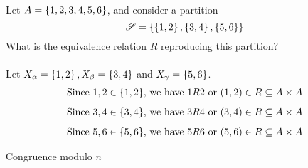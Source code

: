 \begin{example}
Let $A = \left\{1,2,3,4,5,6\right\}$, and consider a partition
\[\mathscr{S} = \left\{\left\{1,2\right\},\left\{3,4\right\},\left\{5,6\right\}\right\}\]
What is the equivalence relation $R$ reproducing this partition?\\
\\
Let $X_\alpha = \left\{1,2\right\},X_\beta = \left\{3,4\right\}$ and $X_\gamma = \left\{5,6\right\}$.
\begin{align*}
\text{Since $1,2 \in \left\{1,2\right\}$, we have}& \text{ $1R2$ or $(1,2) \in R \subseteq A \times A$}\\[0.5em]
\text{Since $3,4 \in \left\{3,4\right\}$, we have}& \text{ $3R4$ or $(3,4) \in R \subseteq A \times A$}\\[0.5em]
\text{Since $5,6 \in \left\{5,6\right\}$, we have}& \text{ $5R6$ or $(5,6) \in R \subseteq A \times A$}
\end{align*}
\end{example}

\vspace*{2em}

\begin{mdframed}
\begin{center}
{\Large Congruence modulo $n$}
\end{center}
\end{mdframed}

